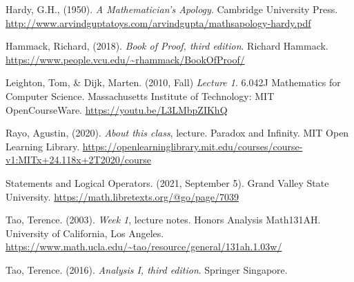 \documentclass{article}[12pt]
\begin{document}
    \begin{thebibliography}{9}
        
        
        Hardy, G.H., (1950). \emph{A Mathematician's Apology}. Cambridge University Press.
        \url{http://www.arvindguptatoys.com/arvindgupta/mathsapology-hardy.pdf}
        
        Hammack, Richard, (2018). \emph{Book of Proof, third edition}. Richard Hammack. \url{https://www.people.vcu.edu/~rhammack/BookOfProof/}
        
        Leighton, Tom, \& Dijk, Marten. (2010, Fall) \emph{Lecture 1}. 6.042J Mathematics for Computer Science. Massachusetts Institute of Technology: MIT OpenCourseWare. \url{https://youtu.be/L3LMbpZIKhQ}
        
        Rayo, Agustin, (2020). \emph{About this class}, lecture. Paradox and Infinity. MIT Open Learning Library. \url{https://openlearninglibrary.mit.edu/courses/course-v1:MITx+24.118x+2T2020/course}
        
        Statements and Logical Operators. (2021, September 5). Grand Valley State University. \url{https://math.libretexts.org/@go/page/7039}
        
        Tao, Terence. (2003). \emph{Week 1}, lecture notes. Honors Analysis Math131AH. University of California, Los Angeles. \url{https://www.math.ucla.edu/~tao/resource/general/131ah.1.03w/}
        
        Tao, Terence. (2016). \emph{Analysis I, third edition}. Springer Singapore.
        
    \end{thebibliography}
    
\end{document}
